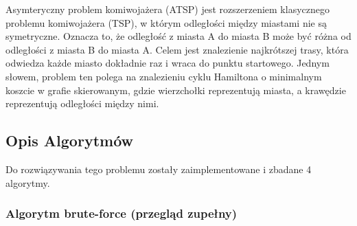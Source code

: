 \documentclass[a4paper,12pt]{article}
\begin{document}
Asymteryczny problem komiwojażera (ATSP) jest rozszerzeniem klasycznego problemu komiwojażera (TSP), w którym odległości między miastami nie są symetryczne. Oznacza to, że odległość z miasta A do miasta B może być różna od odległości z miasta B do miasta A. Celem jest znalezienie najkrótszej trasy, która odwiedza każde miasto dokładnie raz i wraca do punktu startowego.
Jednym słowem, problem ten polega na znalezieniu cyklu Hamiltona o minimalnym koszcie w grafie skierowanym, gdzie wierzchołki reprezentują miasta, a krawędzie reprezentują odległości między nimi.

\subsection{Opis Algorytmów}

Do rozwiązywania tego problemu zostały zaimplementowane i zbadane 4 algorytmy.

\subsubsection{Algorytm brute-force (przegląd zupełny)}
\end{document}
